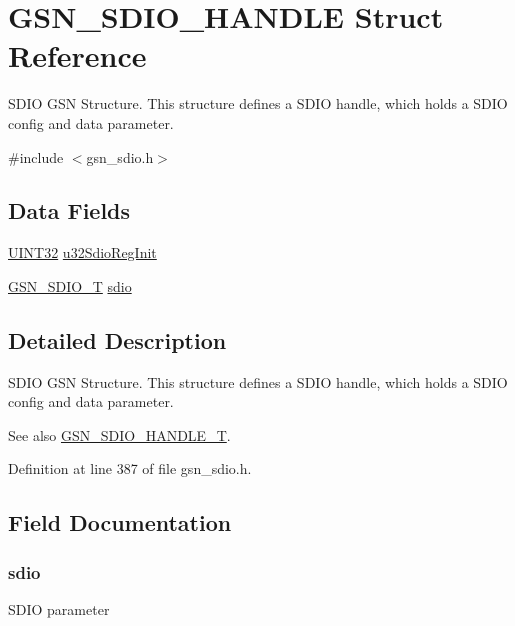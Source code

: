 \hypertarget{a00224}{
\section{GSN\_\-SDIO\_\-HANDLE Struct Reference}
\label{a00224}
}


SDIO GSN Structure. This structure defines a SDIO handle, which holds a SDIO config and data parameter.  




{\ttfamily \#include $<$gsn\_\-sdio.h$>$}

\subsection*{Data Fields}
\begin{DoxyCompactItemize}
\item 
\hyperlink{a00660_gae1e6edbbc26d6fbc71a90190d0266018}{UINT32} \hyperlink{a00224_a97df769de934b3150a03bd45577f37b8}{u32SdioRegInit}
\item 
\hyperlink{a00216}{GSN\_\-SDIO\_\-T} \hyperlink{a00224_a6e16b3c29b71b48819a78228f30dbd52}{sdio}
\end{DoxyCompactItemize}


\subsection{Detailed Description}
SDIO GSN Structure. This structure defines a SDIO handle, which holds a SDIO config and data parameter. 

\begin{DoxySeeAlso}{See also}
\hyperlink{a00653_gaa50b5846f8905e5a7ab1cec63e6877a7}{GSN\_\-SDIO\_\-HANDLE\_\-T}. 
\end{DoxySeeAlso}


Definition at line 387 of file gsn\_\-sdio.h.



\subsection{Field Documentation}
\hypertarget{a00224_a6e16b3c29b71b48819a78228f30dbd52}{
\subsubsection[{sdio}]{ {\bf sdio}}}
\label{a00224_a6e16b3c29b71b48819a78228f30dbd52}
SDIO parameter 

